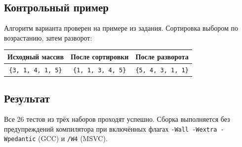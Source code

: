 \subsection{Контрольный пример}

Алгоритм варианта проверен на примере из задания. Сортировка выбором по
возрастанию, затем разворот:

\begin{center}
\begin{tabular}{|c|c|c|}
\hline
Исходный массив & После сортировки & После разворота \\
\hline
\texttt{\{3, 1, 4, 1, 5\}} & \texttt{\{1, 1, 3, 4, 5\}} & \texttt{\{5, 4, 3, 1, 1\}} \\
\hline
\end{tabular}
\end{center}

\subsection{Результат}

Все 26 тестов из трёх наборов проходят успешно. Сборка выполняется без
предупреждений компилятора при включённых флагах
\texttt{-Wall -Wextra -Wpedantic} (GCC) и \texttt{/W4} (MSVC).
